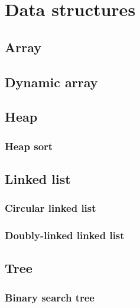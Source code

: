 \chapter{Data structures}\label{chapter:data-structures}

\section{Array}

\section{Dynamic array}

\section{Heap}

\subsection{Heap sort}

\section{Linked list}

\subsection{Circular linked list}

\subsection{Doubly-linked linked list}

\section{Tree}

\subsection{Binary search tree}
